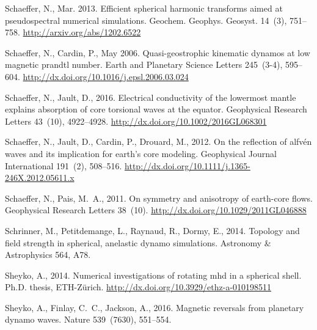 \documentclass[12pt, a4paper]{article}
\begin{document}
\begin{thebibliography}{73}
Schaeffer, N., Mar. 2013. Efficient spherical harmonic transforms aimed at
  pseudospectral numerical simulations. Geochem. Geophys. Geosyst. 14~(3),
  751--758.
\newline\urlprefix\url{http://arxiv.org/abs/1202.6522}

Schaeffer, N., Cardin, P., May 2006. Quasi-geostrophic kinematic dynamos at low
  magnetic prandtl number. Earth and Planetary Science Letters 245~(3-4),
  595--604.
\newline\urlprefix\url{http://dx.doi.org/10.1016/j.epsl.2006.03.024}

Schaeffer, N., Jault, D., 2016. Electrical conductivity of the lowermost mantle
  explains absorption of core torsional waves at the equator. Geophysical
  Research Letters 43~(10), 4922--4928.
\newline\urlprefix\url{http://dx.doi.org/10.1002/2016GL068301}

Schaeffer, N., Jault, D., Cardin, P., Drouard, M., 2012. On the reflection of
  alfv{\'e}n waves and its implication for earth's core modeling. Geophysical
  Journal International 191~(2), 508--516.
\newline\urlprefix\url{http://dx.doi.org/10.1111/j.1365-246X.2012.05611.x}

Schaeffer, N., Pais, M.~A., 2011. On symmetry and anisotropy of earth-core
  flows. Geophysical Research Letters 38~(10).
\newline\urlprefix\url{http://dx.doi.org/10.1029/2011GL046888}

Schrinner, M., Petitdemange, L., Raynaud, R., Dormy, E., 2014. Topology and
  field strength in spherical, anelastic dynamo simulations. Astronomy \&
  Astrophysics 564, A78.

Sheyko, A., 2014. Numerical investigations of rotating mhd in a spherical
  shell. Ph.D. thesis, ETH-Z{\"u}rich.
\newline\urlprefix\url{http://dx.doi.org/10.3929/ethz-a-010198511}

Sheyko, A., Finlay, C.~C., Jackson, A., 2016. Magnetic reversals from planetary
  dynamo waves. Nature 539~(7630), 551--554.


\end{thebibliography}
\end{document}
